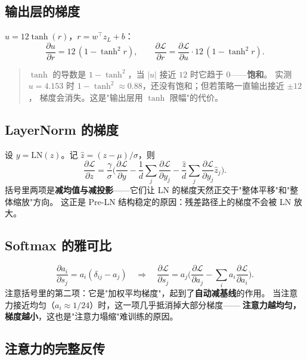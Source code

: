 \subsection{输出层的梯度}

$u=12\tanh(r)$，$r=w^\top z_L+b$：
\begin{equation}
  \frac{\partial u}{\partial r}=12\,(1-\tanh^2 r),\qquad
  \frac{\partial\mathcal{L}}{\partial r}=\frac{\partial\mathcal{L}}{\partial u}\cdot12\,(1-\tanh^2r).
\end{equation}
\begin{quote}
$\tanh$ 的导数是 $1-\tanh^2$，当 $|u|$ 接近 $12$ 时它趋于 $0$——\textbf{饱和}。
实测 $u=4.153$ 时 $1-\tanh^2\approx0.88$，还没有饱和；但若策略一直输出接近 $\pm12$，
梯度会消失。这是"输出层用 $\tanh$ 限幅"的代价。
\end{quote}

\subsection{LayerNorm 的梯度}

设 $y=\mathrm{LN}(z)$。记 $\hat z=(z-\mu)/\sigma$，则
\begin{equation}
  \frac{\partial\mathcal{L}}{\partial z}
  =\frac{\gamma}{\sigma}\Big(\frac{\partial\mathcal{L}}{\partial y}
   -\frac1d\sum_j\frac{\partial\mathcal{L}}{\partial y_j}
   -\frac{\hat z}{d}\sum_j\frac{\partial\mathcal{L}}{\partial y_j}\hat z_j\Big).
\end{equation}
括号里两项是\textbf{减均值与减投影}——它们让 LN 的梯度天然正交于"整体平移"和"整体缩放"方向。
这正是 Pre-LN 结构稳定的原因：残差路径上的梯度不会被 LN 放大。

\subsection{Softmax 的雅可比}

\begin{equation}
  \frac{\partial a_i}{\partial s_j}=a_i(\delta_{ij}-a_j)
  \quad\Longrightarrow\quad
  \frac{\partial\mathcal{L}}{\partial s_j}=a_j\Big(\frac{\partial\mathcal{L}}{\partial a_j}
   -\sum_i a_i\frac{\partial\mathcal{L}}{\partial a_i}\Big).
\end{equation}
注意括号里的第二项：它是"加权平均梯度"，起到了\textbf{自动减基线}的作用。
当注意力接近均匀（$a_i\approx1/24$）时，这一项几乎抵消掉大部分梯度——
\textbf{注意力越均匀，梯度越小}，这也是"注意力塌缩"难训练的原因。

\subsection{注意力的完整反传}


